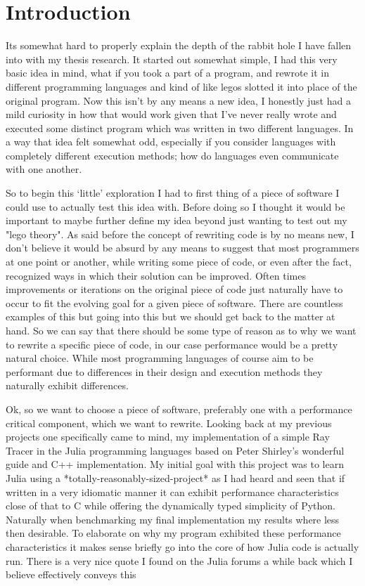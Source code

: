 \section{Introduction}\label{s:intro}

Its somewhat hard to properly explain the depth of the rabbit hole I have fallen into with my thesis research. It started out somewhat simple, I had this very basic idea in mind, what if you took a part of a program, and rewrote it in different programming languages and kind of like legos slotted it into place of the original program. Now this isn't by any means a new idea, I honestly just had a mild curiosity in how that would work given that I've never really wrote and executed some distinct program which was written in two different languages. In a way that idea felt somewhat odd, especially if you consider languages with completely different execution methods; how do languages even communicate with one another. 

So to begin this `little' exploration I had to first thing of a piece of software I could use to actually test this idea with. Before doing so I thought it would be important to maybe further define my idea beyond just wanting to test out my "lego theory". As said before the concept of rewriting code is by no means new, I don't believe it would be absurd by any means to suggest that most programmers at one point or another, while writing some piece of code, or even after the fact, recognized ways in which their solution can be improved. Often times improvements or iterations on the original piece of code just naturally have to occur to fit the evolving goal for a given piece of software. There are countless examples of this but going into this but we should get back to the matter at hand. So we can say that there should be some type of reason as to why we want to rewrite a specific piece of code, in our case performance would be a pretty natural choice. While most programming languages of course aim to be performant due to differences in their design and execution methods they naturally exhibit differences. 

Ok, so we want to choose a piece of software, preferably one with a performance critical component, which we want to rewrite. Looking back at my previous projects one specifically came to mind, my implementation of a simple Ray Tracer in the Julia programming languages based on Peter Shirley's wonderful guide and C++ implementation. My initial goal with this project was to learn Julia using a *totally-reasonably-sized-project* as I had heard and seen that if written in a very idiomatic manner it can exhibit performance characteristics close of that to C while offering the dynamically typed simplicity of Python. Naturally when benchmarking my final implementation my results where less then desirable. To elaborate on why my program exhibited these performance characteristics it makes sense briefly go into the core of how Julia code is actually run. There is a very nice quote I found on the Julia forums a while back which I believe effectively conveys this


